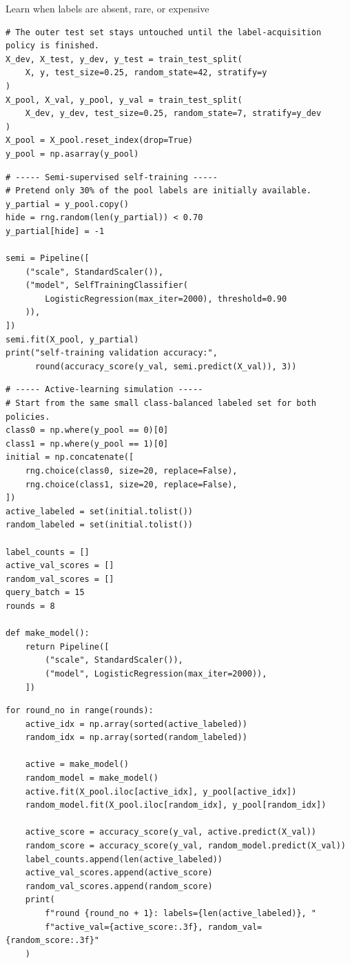 \begin{labproject}{Learn when labels are absent, rare, or expensive}
\begin{lstlisting}[style=mlpython]
# The outer test set stays untouched until the label-acquisition policy is finished.
X_dev, X_test, y_dev, y_test = train_test_split(
    X, y, test_size=0.25, random_state=42, stratify=y
)
X_pool, X_val, y_pool, y_val = train_test_split(
    X_dev, y_dev, test_size=0.25, random_state=7, stratify=y_dev
)
X_pool = X_pool.reset_index(drop=True)
y_pool = np.asarray(y_pool)
\end{lstlisting}

\begin{lstlisting}[style=mlpython]
# ----- Semi-supervised self-training -----
# Pretend only 30% of the pool labels are initially available.
y_partial = y_pool.copy()
hide = rng.random(len(y_partial)) < 0.70
y_partial[hide] = -1

semi = Pipeline([
    ("scale", StandardScaler()),
    ("model", SelfTrainingClassifier(
        LogisticRegression(max_iter=2000), threshold=0.90
    )),
])
semi.fit(X_pool, y_partial)
print("self-training validation accuracy:",
      round(accuracy_score(y_val, semi.predict(X_val)), 3))
\end{lstlisting}

\begin{lstlisting}[style=mlpython]
# ----- Active-learning simulation -----
# Start from the same small class-balanced labeled set for both policies.
class0 = np.where(y_pool == 0)[0]
class1 = np.where(y_pool == 1)[0]
initial = np.concatenate([
    rng.choice(class0, size=20, replace=False),
    rng.choice(class1, size=20, replace=False),
])
active_labeled = set(initial.tolist())
random_labeled = set(initial.tolist())

label_counts = []
active_val_scores = []
random_val_scores = []
query_batch = 15
rounds = 8

def make_model():
    return Pipeline([
        ("scale", StandardScaler()),
        ("model", LogisticRegression(max_iter=2000)),
    ])
\end{lstlisting}

\begin{lstlisting}[style=mlpython]
for round_no in range(rounds):
    active_idx = np.array(sorted(active_labeled))
    random_idx = np.array(sorted(random_labeled))

    active = make_model()
    random_model = make_model()
    active.fit(X_pool.iloc[active_idx], y_pool[active_idx])
    random_model.fit(X_pool.iloc[random_idx], y_pool[random_idx])

    active_score = accuracy_score(y_val, active.predict(X_val))
    random_score = accuracy_score(y_val, random_model.predict(X_val))
    label_counts.append(len(active_labeled))
    active_val_scores.append(active_score)
    random_val_scores.append(random_score)
    print(
        f"round {round_no + 1}: labels={len(active_labeled)}, "
        f"active_val={active_score:.3f}, random_val={random_score:.3f}"
    )


\end{lstlisting}
\end{labproject}
